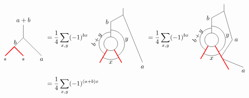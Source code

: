 	\begin{align}
		\begin{tikzpicture}[scale=0.7,baseline=(current bounding box.center)]
			\draw[] (0,0) -- (0,1) node[pos=1,above]{$a+b$};
			\draw[] (0,0) -- (-0.707107,-0.707107) node [pos=.5,left] {$b$};
			\draw[red,line width=0.4mm] (-0.707107,-0.707107) -- (-1.41421,-1.41421);
			\draw[red,line width=0.4mm] (-0.707107,-0.707107) -- (0,-1.41421);
			\draw (0,0) -- (0.707107,-0.707107);
			\draw (0.707107,-0.707107) -- (1.41421,-1.41421);
			\node at (-1.41421,-1.7) {$*$};
			\node at (0,-1.7) {$*$};
			\node at (1.41421,-1.7) {$a$};
		\end{tikzpicture}&=
		\frac{1}{4}\sum_{x,y}(-1)^{bx}
		\begin{tikzpicture}[scale=.75,baseline=(current bounding box.center)]
			\draw (0,0) circle (0.5cm);
			\draw[red,line width=0.4mm]
			\foreach \a in {-60, -120} {
				(\a:0.5) -- (\a:1.6)
			};
			\draw[] (90:0.5) -- (90:1.6);
			\draw ([shift=(-60:1cm)]0,0) arc (-60:90:1cm);
			\draw ([shift=(-120:1.15cm)]0,0) arc (-120:-60:1.15cm);
			\draw ([shift=(240:0.85cm)]0,0) arc (240:90:0.85cm);
			\draw[] (0,1.6) -- (0.9,2.1) node[pos=0,left] {$b$};
			\draw[] (0.9,2.1) -- (0.9,2.6);
			\draw (0.9,2.1) -- (2.3,-1.35);
			\node[rotate=60] at (-1,0.3) {$b+y$};
			\node at (1.15,0.3) {$y$};
			\node at (2.3,-1.7) {$a$};
			\node at (0,-1.35) {$x$};
		\end{tikzpicture}
		=\frac{1}{4}\sum_{x,y}(-1)^{bx}
		\begin{tikzpicture}[scale=.75,baseline=(current bounding box.center)]
		\draw (0,0) circle (0.5cm);
		\draw[red,line width=0.4mm]
		\foreach \a in {-60, -120} {
			(\a:0.5) -- (\a:1.6)
		};
		\draw[] (90:0.5) -- (90:1.6);
		\draw ([shift=(-60:1cm)]0,0) arc (-60:90:1cm);
		\draw ([shift=(-120:1.15cm)]0,0) arc (-120:-60:1.15cm);
		\draw ([shift=(240:0.85cm)]0,0) arc (240:90:0.85cm);
		\draw[] (0,1.6) -- (0.9,2.1) node[pos=0,left] {$b$};
		\draw[] (0.9,2.1) -- (0.9,2.6);
		\draw (-60:1.6) -- (2.3,-2) node[pos=1,below] {$a$};
		\draw (-60:1.4) --(1.5,0) node[right]{$a$} -- (0.9,2.1);
		\node[rotate=60] at (-1,0.3) {$b+y$};
		\node at (1.15,0.3) {$y$};
		\node at (0,-1.35) {$x$};
		\draw[red,line width=0.4mm] (-60:1.6)--(-60:2.5);
		\end{tikzpicture}
		\\
		&=\frac{1}{4}\sum_{x,y}(-1)^{(a+b)x}
		\begin{tikzpicture}[scale=.75,baseline=(current bounding box.center)]

\end{tikzpicture}
\end{align}
